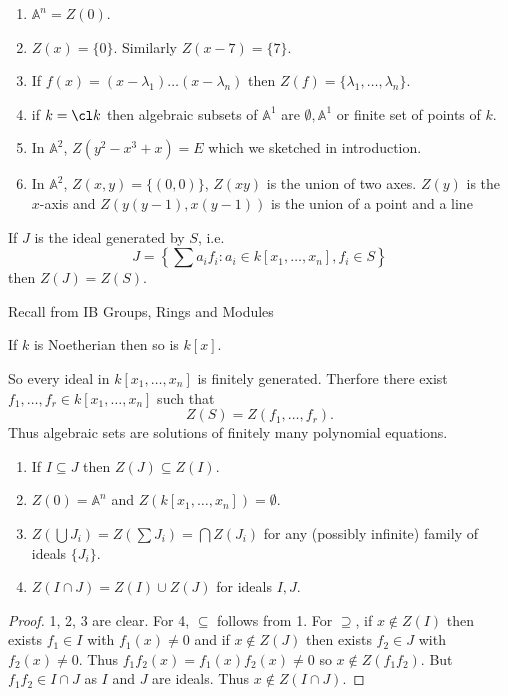 \documentclass[a4paper]{article}
\renewcommand{\A}{\mathbb{A}}
\begin{document}
\begin{eg}\leavevmode
  \begin{enumerate}
  \item \(\A^n = Z(0)\).
  \item \(Z(x) = \{0\}\). Similarly \(Z(x - 7) = \{7\}\).
  \item If \(f(x) = (x - \lambda_1) \dots (x - \lambda_n)\) then \(Z(f) = \{\lambda_1, \dots, \lambda_n\}\).
  \item if \(k = \cl k\) then algebraic subsets of \(\A^1\) are \(\emptyset, \A^1\) or finite set of points of \(k\).
  \item In \(\A^2\), \(Z(y^2 - x^3 + x) = E\) which we sketched in introduction.
  \item In \(\A^2\), \(Z(x, y) = \{(0, 0)\}\), \(Z(xy)\) is the union of two axes. \(Z(y)\) is the \(x\)-axis and \(Z(y(y - 1), x(y - 1))\) is the union of a point and a line
  \end{enumerate}
\end{eg}

If \(J\) is the ideal generated by \(S\), i.e.
\[
  J = \left\{\sum a_i f_i: a_i \in k[x_1, \dots, x_n], f_i \in S\right\}
\]
then \(Z(J) = Z(S)\).

Recall from IB Groups, Rings and Modules

\begin{theorem}
  If \(k\) is Noetherian then so is \(k[x]\).
\end{theorem}

So every ideal in \(k[x_1, \dots, x_n]\) is finitely generated. Therfore there exist \(f_1, \dots, f_r \in k[x_1, \dots, x_n]\) such that
\[
  Z(S) = Z(f_1, \dots, f_r).
\]
Thus algebraic sets are solutions of finitely many polynomial equations.

\begin{lemma}\leavevmode
  \begin{enumerate}
  \item If \(I \subseteq J\) then \(Z(J) \subseteq Z(I)\).
  \item \(Z(0) = \A^n\) and \(Z(k[x_1, \dots, x_n]) = \emptyset\).
  \item \(Z(\bigcup J_i) = Z(\sum J_i) = \bigcap Z(J_i)\) for any (possibly infinite) family of ideals \(\{J_i\}\).
  \item \(Z(I \cap J) = Z(I) \cup Z(J)\) for ideals \(I, J\).
  \end{enumerate}
\end{lemma}

\begin{proof}
  1, 2, 3 are clear. For 4, \(\subseteq\) follows from 1. For \(\supseteq\), if \(x \notin Z(I)\) then exists \(f_1 \in I\) with \(f_1(x) \neq 0\) and if \(x \notin Z(J)\) then exists \(f_2 \in J\) with \(f_2(x) \neq 0\). Thus \(f_1f_2(x) = f_1(x)f_2(x) \neq 0\) so \(x \notin Z(f_1f_2)\). But \(f_1f_2 \in I \cap J\) as \(I\) and \(J\) are ideals. Thus \(x \notin Z(I \cap J)\).
\end{proof}
\end{document}
